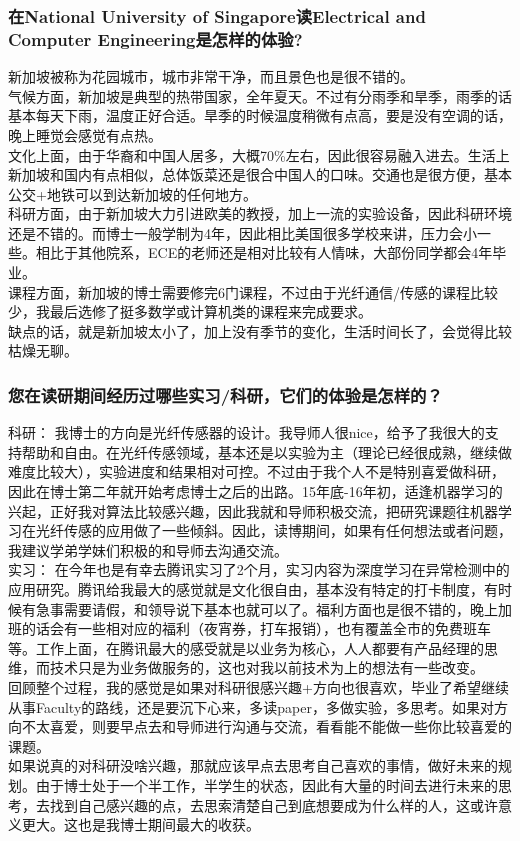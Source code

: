 \documentclass[a4paper,UTF8]{book}
\begin{document}
    \subsubsection*{在National University of Singapore读Electrical and Computer Engineering是怎样的体验?}
    新加坡被称为花园城市，城市非常干净，而且景色也是很不错的。\\
    气候方面，新加坡是典型的热带国家，全年夏天。不过有分雨季和旱季，雨季的话基本每天下雨，温度正好合适。旱季的时候温度稍微有点高，要是没有空调的话，晚上睡觉会感觉有点热。\\
    文化上面，由于华裔和中国人居多，大概70\%左右，因此很容易融入进去。生活上新加坡和国内有点相似，总体饭菜还是很合中国人的口味。交通也是很方便，基本公交+地铁可以到达新加坡的任何地方。\\    
    科研方面，由于新加坡大力引进欧美的教授，加上一流的实验设备，因此科研环境还是不错的。而博士一般学制为4年，因此相比美国很多学校来讲，压力会小一些。相比于其他院系，ECE的老师还是相对比较有人情味，大部份同学都会4年毕业。\\
    课程方面，新加坡的博士需要修完6门课程，不过由于光纤通信/传感的课程比较少，我最后选修了挺多数学或计算机类的课程来完成要求。\\
    缺点的话，就是新加坡太小了，加上没有季节的变化，生活时间长了，会觉得比较枯燥无聊。

    \subsubsection*{您在读研期间经历过哪些实习/科研，它们的体验是怎样的？}
    科研：
    我博士的方向是光纤传感器的设计。我导师人很nice，给予了我很大的支持帮助和自由。在光纤传感领域，基本还是以实验为主（理论已经很成熟，继续做难度比较大），实验进度和结果相对可控。不过由于我个人不是特别喜爱做科研，因此在博士第二年就开始考虑博士之后的出路。15年底-16年初，适逢机器学习的兴起，正好我对算法比较感兴趣，因此我就和导师积极交流，把研究课题往机器学习在光纤传感的应用做了一些倾斜。因此，读博期间，如果有任何想法或者问题，我建议学弟学妹们积极的和导师去沟通交流。\\
    实习：
    在今年也是有幸去腾讯实习了2个月，实习内容为深度学习在异常检测中的应用研究。腾讯给我最大的感觉就是文化很自由，基本没有特定的打卡制度，有时候有急事需要请假，和领导说下基本也就可以了。福利方面也是很不错的，晚上加班的话会有一些相对应的福利（夜宵券，打车报销），也有覆盖全市的免费班车等。工作上面，在腾讯最大的感受就是以业务为核心，人人都要有产品经理的思维，而技术只是为业务做服务的，这也对我以前技术为上的想法有一些改变。\\
    回顾整个过程，我的感觉是如果对科研很感兴趣+方向也很喜欢，毕业了希望继续从事Faculty的路线，还是要沉下心来，多读paper，多做实验，多思考。如果对方向不太喜爱，则要早点去和导师进行沟通与交流，看看能不能做一些你比较喜爱的课题。\\
    如果说真的对科研没啥兴趣，那就应该早点去思考自己喜欢的事情，做好未来的规划。由于博士处于一个半工作，半学生的状态，因此有大量的时间去进行未来的思考，去找到自己感兴趣的点，去思索清楚自己到底想要成为什么样的人，这或许意义更大。这也是我博士期间最大的收获。
\end{document}
